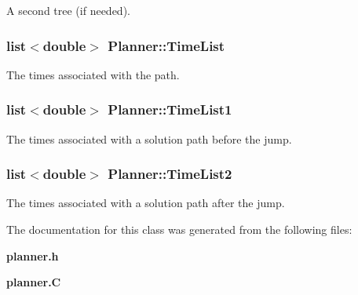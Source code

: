 A second tree (if needed).

\subsubsection{\setlength{\rightskip}{0pt plus 5cm}list$<$double$>$ Planner::Time\-List}\label{classPlanner_m3}


The times associated with the path.

\subsubsection{\setlength{\rightskip}{0pt plus 5cm}list$<$double$>$ Planner::Time\-List1}\label{classPlanner_m5}


The times associated with a solution path before the jump.

\subsubsection{\setlength{\rightskip}{0pt plus 5cm}list$<$double$>$ Planner::Time\-List2}\label{classPlanner_m7}


The times associated with a solution path after the jump.



The documentation for this class was generated from the following files:\begin{CompactItemize}
\item 
{\bf planner.h}\item 
{\bf planner.C}\end{CompactItemize}
